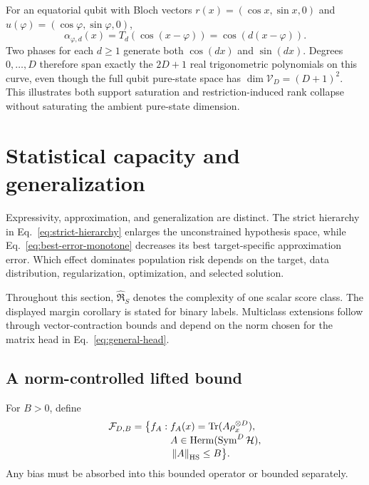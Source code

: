 \documentclass[pdflatex,sn-mathphys,NameDate,iicol]{sn-jnl}
\newcommand{\Tr}{\operatorname{Tr}}
\newcommand{\norm}[1]{\left\lVert #1\right\rVert}
\newcommand{\Herm}{\operatorname{Herm}}
\newcommand{\Sym}{\operatorname{Sym}}
\newcommand{\Rad}{\mathfrak{R}}
\newcommand{\cF}{\mathcal{F}}
\newcommand{\cH}{\mathcal{H}}
\newcommand{\cV}{\mathcal{V}}
\begin{document}
For an equatorial qubit with Bloch vectors
$r(x)=(\cos x,\sin x,0)$ and
$u(\varphi)=(\cos\varphi,\sin\varphi,0)$,
\begin{equation}
  \alpha_{\varphi,d}(x)
  =
  T_d(\cos(x-\varphi))
  =
  \cos(d(x-\varphi)).
\end{equation}
Two phases for each $d\ge1$ generate both $\cos(dx)$ and $\sin(dx)$.
Degrees $0,\ldots,D$ therefore span exactly the $2D+1$ real
trigonometric polynomials on this curve, even though the full qubit
pure-state space has $\dim\cV_D=(D+1)^2$. This illustrates both support
saturation and restriction-induced rank collapse without saturating the
ambient pure-state dimension.

\section{Statistical capacity and generalization}
\label{sec:generalization}

Expressivity, approximation, and generalization are distinct. The strict
hierarchy in Eq.~\eqref{eq:strict-hierarchy} enlarges the unconstrained
hypothesis space, while Eq.~\eqref{eq:best-error-monotone} decreases its
best target-specific approximation error. Which effect dominates population
risk depends on the target, data distribution, regularization, optimization,
and selected solution.

Throughout this section, $\widehat{\Rad}_S$ denotes the complexity of one
scalar score class. The displayed margin corollary is stated for binary
labels. Multiclass extensions follow through vector-contraction bounds and
depend on the norm chosen for the matrix head in
Eq.~\eqref{eq:general-head}.

\subsection{A norm-controlled lifted bound}

For $B>0$, define
\begin{equation}
  \begin{aligned}
  \cF_{D,B}=\bigl\{f_A:{}&
    f_A(x)=\Tr(A\rho_x^{\otimes D}),\\[-1mm]
    &A\in\Herm(\Sym^D\cH),\\[-1mm]
    &\norm A_{\rm HS}\le B\bigr\}.
  \end{aligned}
  \label{eq:norm-class}
\end{equation}
Any bias must be absorbed into this bounded operator or bounded separately.
\end{document}
